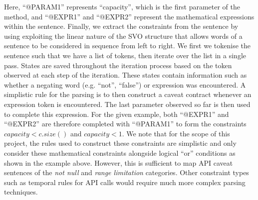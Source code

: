 Here, ``@PARAM1'' represents ``capacity'', which is the first parameter of the method, and ``@EXPR1'' and ``@EXPR2'' represent the mathematical expressions within the sentence. Finally, we extract the constraints from the sentence by using exploiting the linear nature of the SVO structure that allows words of a sentence to be considered in sequence from left to right. We first we tokenise the sentence such that we have a list of tokens, then iterate over the list in a single pass. States are saved throughout the iteration process based on the token observed at each step of the iteration. These states contain information such as whether a negating word (e.g. ``not'', ``false'') or expression was encountered. A simplistic rule for the parsing is to then construct a caveat contract whenever an expression token is encountered. The last parameter observed so far is then used to complete this expression. For the given example, both ``@EXPR1'' and ``@EXPR2'' are therefore completed with ``@PARAM1'' to form the constraints $capacity<c.size()$ and $capacity<1$. We note that for the scope of this project, the rules used to construct these constraints are simplistic and only consider these mathematical constraints alongside logical ``or'' conditions as shown in the example above. However, this is sufficient to map API caveat sentences of the \textit{not null} and \textit{range limitation} categories.  Other constraint types such as temporal rules for API calls would require much more complex parsing techniques. \\


